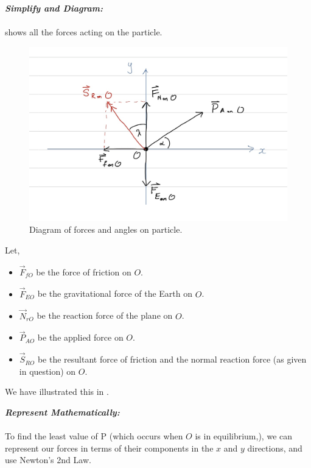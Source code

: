 \begin{subquestions}
\begin{subsubquestions}
	\textbf{\textit{Simplify and Diagram:}} \\ \\
	 shows all the forces acting on the particle.
	\begin{figure} [H]
		\begin{center} 
			\includegraphics[scale=0.25]{../2014/figures/2014q55Diagram}
			\caption{\label{2014:q55:Force2} Diagram of forces and angles on particle.}
		\end{center}
	\end{figure}
	
	Let,
	\begin{itemize}
		\item $\vec{F}_{fO}$ be the force of friction on $O$.
		\item $\vec{F}_{EO}$ be the gravitational force of the Earth on $O$.
		\item $\vec{N}_{rO}$ be the reaction force of the plane on $O$.
		\item $\vec{P}_{AO}$ be the applied force on $O$.
		\item $\vec{S}_{RO}$ be the resultant force of friction and the normal reaction force (as given in question) on $O$.
	\end{itemize}
	
	We have illustrated this in .
	
	
	
	\textbf{\textit{Represent Mathematically:}} \\ \\
	To find the least value of P (which occurs when $O$ is in equilibrium,), we can represent our forces in terms of their components in the $x$ and $y$ directions, and use Newton's 2nd Law.
	

\end{subsubquestions}
\end{subquestions}
